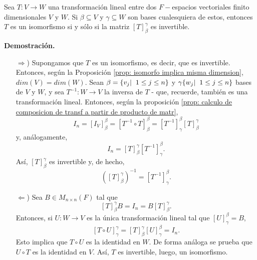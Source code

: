 \begin{teo}
Sea $T: V \longrightarrow W$ una transformación lineal entre dos
$F-$espacios vectoriales finito dimensionales $V$ y $W$.
Si $\beta \subseteq V$ y $\gamma \subseteq W$ son bases cualesquiera
de estos, entonces $T$ es un isomorfismo si y sólo si la matriz
$[T]_{\beta}^{\gamma}$ es invertible.
\end{teo}
\noindent
\textbf{Demostración.}
\begin{itemize}
	\item[$\Rightarrow$)] Supongamos que $T$ es un isomorfismo, es decir,
	que es invertible. Entonces, según la Proposición 
	\ref{prop: isomorfo implica misma dimension}, $dim(V) = dim(W)$.
	Sean $\beta = \{ v_{j}  | \hspace{0.2cm} 1 \leq j \leq n \}$ y
	$\gamma \{ w_{j}  | \hspace{0.2cm} 1 \leq j \leq n \}$ bases de $V$
	y $W$, y sea $T^{-1}: W \longrightarrow V$ la inversa de $T$ - que, 
	recuerde, también es una transformación lineal. Entonces, 
	según la proposición
	\ref{prop: calculo de composicion de transf a partir de producto de matr},
	\[
	I_{n} = [I_{V}]_{\beta}^{\beta} = [T^{-1} \circ T]_{\beta}^{\beta}
	= [T^{-1}]_{\gamma}^{\beta} [T]_{\beta}^{\gamma}
	\]
	y, análogamente,
	\[
	I_{n} = [T]_{\beta}^{\gamma} [T^{-1}]_{\gamma}^{\beta}.
	\]
	Así, $[T]_{\beta}^{\gamma}$ es invertible y, de hecho,
	\begin{equation}
		\label{eq: inversa de repr matr de T}
		([T]_{\beta}^{\gamma})^{-1} = [T^{-1}]_{\gamma}^{\beta}.
	\end{equation}
	
	\item[$\Leftarrow$)] Sea $B \in M_{n \times n}(F)$ tal que
	\[
	[T]_{\beta}^{\gamma}B = I_{n} = B [T]_{\beta}^{\gamma}.
	\]
	Entonces, si $U: W \longrightarrow V$ es la única transformación lineal
	tal que $[U]_{\gamma}^{\beta} = B$, 
	\[
	[T \circ U]_{\gamma}^{\gamma} = [T]_{\beta}^{\gamma} [U]_{\gamma}^{\beta}
	= I_{n}.
	\]
	Esto implica que $T \circ U$ es la identidad en $W$. De forma
	análoga se prueba que $U \circ T$ es la identidad en $V$. Así,
	$T$ es invertible, luego, un isomorfismo.
\end{itemize}

\QEDB
\vspace{0.2cm}

